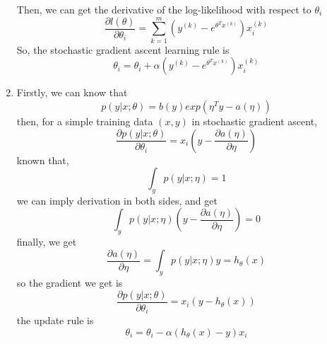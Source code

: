 \documentclass[12pt]{article}
\begin{document}
\begin{enumerate}[label=(\alph*)]
    Then, we can get the derivative of the log-likelihood with respect to $\theta_i$
    $$ \frac{\partial l(\theta)}{\partial \theta_i} 
       = \sum_{k=1}^m (y^{(k)}-e^{\theta^Tx^{(k)}})x^{(k)}_i
    $$
    So, the stochastic gradient ascent learning rule is
    $$ \theta_i = \theta_i + \alpha(y^{(k)}-e^{\theta^Tx^{(k)}})x^{(k)}_i
    $$

    \item 
    
    Firstly, we can know that
    $$ p(y|x;\theta) = b(y)exp(\eta^Ty-a(\eta)) $$
    then, for a simple training data $(x,y)$ in stochastic gradient ascent,
    $$ \frac{\partial p(y|x;\theta)}{\partial \theta_i} 
        = x_i(y-\frac{\partial a(\eta)}{\partial \eta})
    $$
    known that,
    $$ \int_{y}p(y|x;\eta) = 1 $$
    we can imply derivation in both sides, and get
    $$ \int_{y}p(y|x;\eta)(y-\frac{\partial a(\eta)}{\partial \eta}) = 0 $$
    finally, we get
    $$ \frac{\partial a(\eta)}{\partial \eta} = \int_{y}p(y|x;\eta)y = h_\theta(x) $$
    so the gradient we get is
    $$ \frac{\partial p(y|x;\theta)}{\partial \theta_i} 
        = x_i(y-h_\theta(x))
    $$
    the update rule is
    $$ \theta_i = \theta_i - \alpha(h_\theta(x)-y)x_i $$
    \end{enumerate}

    

    \newpage
\end{document}
